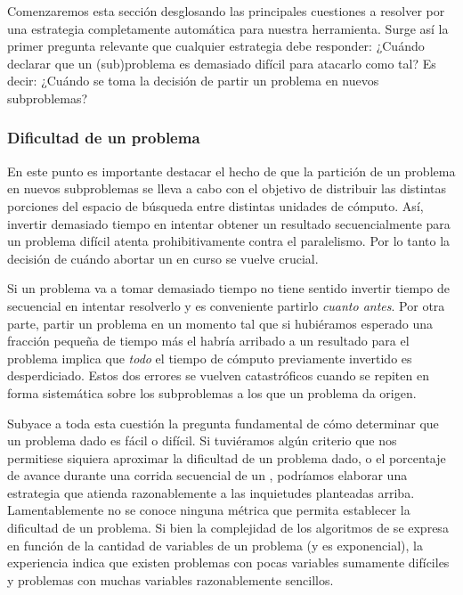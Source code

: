 

Comenzaremos esta sección desglosando las principales cuestiones a
resolver por una estrategia completamente automática para nuestra herramienta.
Surge así la primer pregunta relevante que cualquier estrategia debe
responder: ¿Cuándo declarar que un (sub)problema es demasiado difícil para
atacarlo como tal? Es decir: ¿Cuándo se toma la decisión de partir un problema
en nuevos subproblemas?

\subsubsection{Dificultad de un problema}

En este punto es importante destacar el hecho de que la partición de un
problema en nuevos subproblemas se lleva a cabo con el objetivo de distribuir
las distintas porciones del espacio de búsqueda entre distintas unidades de
cómputo. Así, invertir demasiado tiempo en intentar obtener un resultado
secuencialmente para un problema difícil atenta prohibitivamente contra el
paralelismo. Por lo tanto la decisión de cuándo abortar un \solving en curso
se vuelve crucial.

Si un problema va a tomar demasiado tiempo no tiene sentido invertir tiempo de
\solving secuencial en intentar resolverlo y es conveniente partirlo
\emph{cuanto antes}. Por otra parte, partir un problema en un momento tal que
si hubiéramos esperado una fracción  pequeña de tiempo más el \w habría
arribado a un resultado para el problema implica que \emph{todo} el tiempo de
cómputo previamente invertido es desperdiciado. Estos dos errores se vuelven
catastróficos cuando se repiten en forma sistemática sobre los subproblemas a los que un problema da origen.

Subyace a toda esta cuestión la pregunta fundamental de cómo determinar que un
problema dado es fácil o difícil. Si tuviéramos algún criterio que nos
permitiese siquiera aproximar la dificultad de un problema dado, o el
porcentaje de avance durante una corrida secuencial de un \ssolver, podríamos
elaborar una estrategia que atienda razonablemente a las inquietudes
planteadas arriba. Lamentablemente no se conoce ninguna métrica que permita
establecer \apriori la dificultad de un problema. Si bien la complejidad de
los algoritmos de \ssolving se expresa en función de la cantidad de variables
de un problema (y es exponencial), la experiencia indica que existen problemas
con pocas variables sumamente difíciles y problemas con muchas variables
razonablemente sencillos.

